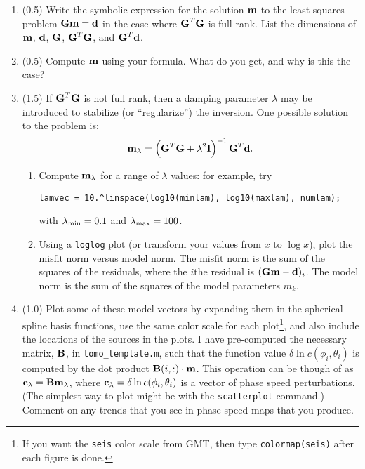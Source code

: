 \documentclass[11pt,titlepage,fleqn]{article}
\begin{document}
\begin{enumerate}
\item (0.5) Write the symbolic expression for the solution $\mbox{${\bf m}$}$ to the least squares problem $\mbox{${\bf G}$}\mbox{${\bf m}$}=\mbox{${\bf d}$}$ in the case where $\mbox{${\bf G}$}^T\mbox{${\bf G}$}$ is full rank.  List the dimensions of $\mbox{${\bf m}$}$, $\mbox{${\bf d}$}$, $\mbox{${\bf G}$}$, $\mbox{${\bf G}$}^T\mbox{${\bf G}$}$, and $\mbox{${\bf G}$}^T\mbox{${\bf d}$}$.

\item (0.5) Compute $\mbox{${\bf m}$}$ using your formula.  What do you get, and why is this the case?

\item (1.5) If $\mbox{${\bf G}$}^T\mbox{${\bf G}$}$ is not full rank, then a damping parameter $\lambda$ may be introduced to stabilize (or ``regularize'') the inversion.  One possible solution to the problem is:
%
\begin{equation}
\mbox{${\bf m}$}_{\lambda} = \left(\mbox{${\bf G}$}^T\mbox{${\bf G}$}+\lambda^2\mbox{${\bf I}$}\right)^{-1}\mbox{${\bf G}$}^T\mbox{${\bf d}$}.
\end{equation}
%
\begin{enumerate}
\item Compute $\mbox{${\bf m}$}_{\lambda}$ for a range of $\lambda$ values: for example, try

\verb+lamvec = 10.^linspace(log10(minlam), log10(maxlam), numlam);+

with $\lambda_{\rm min} = 0.1$ and $\lambda_{\rm max} = 100$.

\item Using a \verb+loglog+ plot (or transform your values from $x$ to $\log x$), plot the misfit norm versus model norm. The misfit norm is the sum of the squares of the residuals, where the $i$the residual is $(\mbox{${\bf G}$}\mbox{${\bf m}$}-\mbox{${\bf d}$})_i$. The model norm is the sum of the squares of the model parameters $m_k$.
\end{enumerate}

\item (1.0) Plot some of these model vectors by expanding them in the spherical spline basis functions, use the same color scale for each plot\footnote{If you want the {\tt seis} color scale from GMT, then type {\tt colormap(seis)} after each figure is done.}, and also include the locations of the sources in the plots. I have pre-computed the necessary matrix, $\mbox{${\bf B}$}$, in \verb+tomo_template.m+, such that the function value $\delta\ln c(\phi_i, \theta_i)$ is computed by the dot product $\mbox{${\bf B}$}(i,:) \cdot \mbox{${\bf m}$}$. This operation can be though of as $\mbox{${\bf c}$}_{\lambda} = \mbox{${\bf B}$} \mbox{${\bf m}$}_{\lambda}$, where $\mbox{${\bf c}$}_{\lambda} = \delta\ln c(\phi_i, \theta_i)$ is a vector of phase speed perturbations. (The simplest way to plot might be with the \verb+scatterplot+ command.) Comment on any trends that you see in phase speed maps that you produce.


\end{enumerate}
\end{document}
